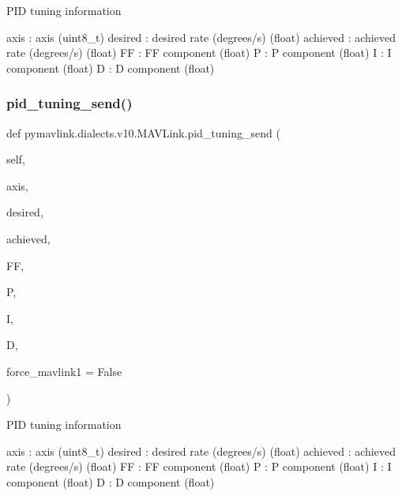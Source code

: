 \begin{DoxyVerb}
\begin{DoxyVerb}
\begin{DoxyVerb}
\begin{DoxyVerb}
\begin{DoxyVerb}PID tuning information

axis                      : axis (uint8_t)
desired                   : desired rate (degrees/s) (float)
achieved                  : achieved rate (degrees/s) (float)
FF                        : FF component (float)
P                         : P component (float)
I                         : I component (float)
D                         : D component (float)\end{DoxyVerb}
 \mbox{\label{classpymavlink_1_1dialects_1_1v10_1_1MAVLink_a6b5e2d6bad9cf417fa0bb0674b021d4c}} 
\subsubsection{\texorpdfstring{pid\+\_\+tuning\+\_\+send()}{pid\_tuning\_send()}}
{\footnotesize\ttfamily def pymavlink.\+dialects.\+v10.\+M\+A\+V\+Link.\+pid\+\_\+tuning\+\_\+send (\begin{DoxyParamCaption}\item[{}]{self,  }\item[{}]{axis,  }\item[{}]{desired,  }\item[{}]{achieved,  }\item[{}]{FF,  }\item[{}]{P,  }\item[{}]{I,  }\item[{}]{D,  }\item[{}]{force\+\_\+mavlink1 = {\ttfamily False} }\end{DoxyParamCaption})}

\begin{DoxyVerb}PID tuning information

axis                      : axis (uint8_t)
desired                   : desired rate (degrees/s) (float)
achieved                  : achieved rate (degrees/s) (float)
FF                        : FF component (float)
P                         : P component (float)
I                         : I component (float)
D                         : D component (float)\end{DoxyVerb}
 \mbox{\label{classpymavlink_1_1dialects_1_1v10_1_1MAVLink_ab77983a69b2d289e2c93cc7d6919807c}} 

\end{DoxyVerb}
\end{DoxyVerb}
\end{DoxyVerb}
\end{DoxyVerb}
